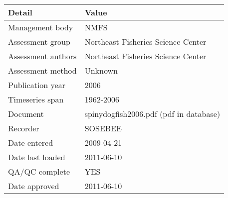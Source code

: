 \begin{table}[htb]
\centering
\begin{tabular}{lp{7cm}}
\toprule
Detail & Value \\
\midrule
Management body    & NMFS                                   \\
Assessment group   & Northeast Fisheries Science Center     \\
Assessment authors & Northeast Fisheries Science Center     \\
Assessment method  & Unknown                                \\
Publication year   & 2006                                   \\
Timeseries span    & 1962-2006                              \\
Document           & spinydogfish2006.pdf (pdf in database) \\
Recorder           & SOSEBEE                                \\
Date entered       & 2009-04-21                             \\
Date last loaded   & 2011-06-10                             \\
QA/QC complete     & YES                                    \\
Date approved      & 2011-06-10                             \\
\bottomrule
\end{tabular}
\label{tab:assessdet}
\end{table}
